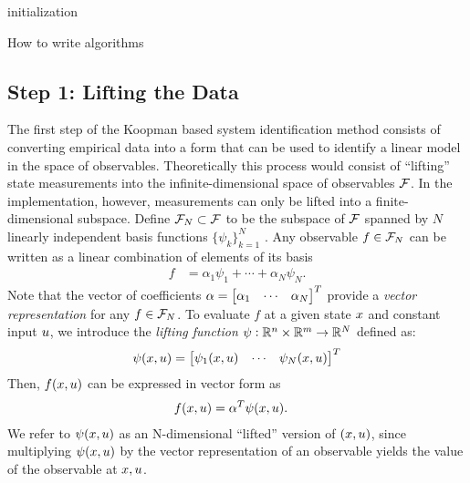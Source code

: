 \begin{algorithm}
\SetAlgoLined
{}
 initialization\;
 \caption{How to write algorithms}
\end{algorithm}


\subsection{Step 1: Lifting the Data}   \label{sec:step1}

The first step of the Koopman based system identification method consists of converting empirical data into a form that can be used to identify a linear model in the space of observables.
Theoretically this process would consist of ``lifting'' state measurements into the infinite-dimensional space of observables $\mathcal{F}$.
In the implementation, however, measurements can only be lifted into a finite-dimensional subspace.
Define $\mathcal{F}_N \subset \mathcal{F}$ to be the subspace of $\mathcal{F}$ spanned by $N$ linearly independent basis functions $\{ \psi_k \}_{k=1}^N$ 
.
%
Any observable ${f \in \mathcal{F}_N}$ can be written as a linear combination of elements of its basis
\begin{align}
    f &= \alpha_1 \psi_{1} + \cdots + \alpha_N \psi_N.
\end{align}
Note that the vector of coefficients ${\alpha = \begin{bmatrix} \alpha_1 & \cdots & \alpha_N \end{bmatrix}^T}$ provide a \emph{vector representation} for any $f \in \mathcal{F}_N$.
To evaluate $f$ at a given state $x$ and constant input $u$, we introduce the \emph{lifting function} ${\psi}:\mathbb{R}^n \times \mathbb{R}^m \to \mathbb{R}^N$ defined as:
\begin{align}
    {\psi}(x, u) = \begin{bmatrix}  \psi_1(x, u) & \cdots & \psi_N(x, u) \end{bmatrix}^T
    \label{eq:lift}
\end{align}
Then, $f(x, u)$ can be expressed in vector form as
\begin{align}
    f(x, u) &= {\alpha}^T {\psi}(x, u).
    \label{eq:fxu}
\end{align}
We refer to ${\psi}(x, u)$ as an N-dimensional ``lifted'' version of ${(x, u)}$, since multiplying ${\psi}(x, u)$ by the vector representation of an observable yields the value of the observable at $x, u$.



